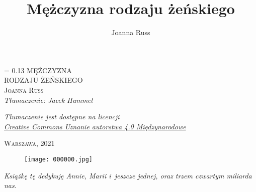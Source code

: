 \documentclass[oneside,polish,12pt,sfheadings]{mwbk}
\begin{document}
\title{Mężczyzna rodzaju żeńskiego}
\author{Joanna Russ}

\DeclareRobustCommand{\cs}[1]{\texttt{\char`\\#1}}
\newlength{\tpheight}\setlength{\tpheight}{0.9\textheight}
\newlength{\txtheight}\setlength{\txtheight}{0.9\tpheight}
\newlength{\tpwidth}\setlength{\tpwidth}{0.9\textwidth}
\newlength{\txtwidth}\setlength{\txtwidth}{0.9\tpwidth}
\newlength{\drop}
\newcommand*{\titleSI}{\begingroup%
\drop = 0.13\txtheight
\centering
\vspace*{\drop}
{\Huge MĘŻCZYZNA}\\[\baselineskip]
{\Huge RODZAJU ŻEŃSKIEGO}\\[2\baselineskip]
{\huge \textsc{Joanna Russ}}\\[3\baselineskip]
{\large \textit{Tłumaczenie: Jacek Hummel}}\\
{\normalsize 
 \textit{Tłumaczenie jest dostępne na licencji\\
\href{https://creativecommons.org/licenses/by/4.0/deed.pl}{Creative Commons Uznanie autorstwa 4.0 Międzynarodowe}}\par}

\vfill
{\Large \textsc{Warszawa, 2021}}\\
\vspace*{\drop}
\endgroup}
\titleSI
\thispagestyle{empty}
\newpage
\begin{figure}[ht!]
\centering
\texttt{[image: 000000.jpg]}
\end{figure}


\newpage
\vspace*{2\baselineskip}
\begin{center}
\textit{Książkę tę dedykuję Annie, Marii i~jeszcze jednej, oraz trzem
czwartym miliarda nas.}
\end{center}

\thispagestyle{empty}
\vspace*{7\baselineskip}
\end{document}
